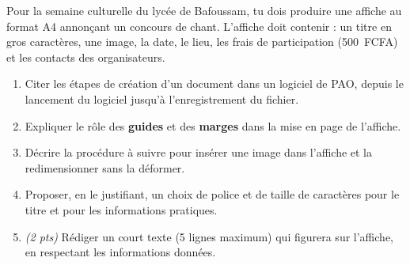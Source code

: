 \documentclass[11pt]{article}
\begin{document}
\begin{exercice}
Pour la semaine culturelle du lycée de Bafoussam, tu dois produire une affiche au format A4 annonçant un concours de chant. L'affiche doit contenir : un titre en gros caractères, une image, la date, le lieu, les frais de participation (\SI{500}{FCFA}) et les contacts des organisateurs.
\begin{enumerate}
  \item Citer les étapes de création d'un document dans un logiciel de PAO, depuis le lancement du logiciel jusqu'à l'enregistrement du fichier.
  \item Expliquer le rôle des \textbf{guides} et des \textbf{marges} dans la mise en page de l'affiche.
  \item Décrire la procédure à suivre pour insérer une image dans l'affiche et la redimensionner sans la déformer.
  \item Proposer, en le justifiant, un choix de police et de taille de caractères pour le titre et pour les informations pratiques.
  \item \textit{(2 pts)} Rédiger un court texte (5 lignes maximum) qui figurera sur l'affiche, en respectant les informations données.
\end{enumerate}
\end{exercice}
\end{document}
